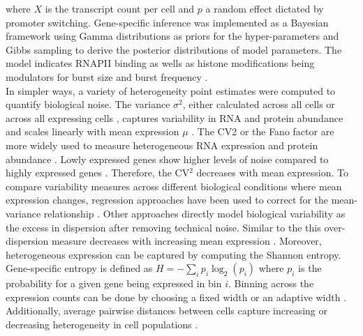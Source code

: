 where $X$ is the transcript count per cell and $p$ a random effect dictated by promoter switching. Gene-specific inference was implemented as a Bayesian framework using Gamma distributions as priors for the hyper-parameters and Gibbs sampling to derive the posterior distributions of model parameters. The model indicates RNAPII binding as wells as histone modifications being modulators for burst size and burst frequency \citep{Kim2013}. \\

In simpler ways, a variety of heterogeneity point estimates were computed to quantify biological noise. The variance $\sigma^2$, either calculated across all cells or across all expressing cells \citep{Shalek2014}, captures variability in RNA and protein abundance and scales linearly with mean expression $\mu$ \citep{Dey2015a}. The \gls{CV2} or the Fano factor are more widely used to measure heterogeneous RNA expression \citep{Brennecke2013, Jones2014} and protein abundance \citep{Newman2006}. Lowly expressed genes show higher levels of noise compared to highly expressed genes \citep{Brennecke2013}. Therefore, the CV$^2$ decreases with mean expression. To compare variability measures across different biological conditions where mean expression changes, regression approaches have been used to correct for the mean-variance relationship \citep{Kolodziejczyk2015cell, Fan2016}. Other approaches directly model biological variability as the excess in dispersion after removing technical noise. Similar to the \citep{Brennecke2013} this over-dispersion measure decreases with increasing mean expression \citep{Vallejos2015BASiCS}. Moreover, heterogeneous expression can be captured by computing the Shannon entropy. Gene-specific entropy is defined as $H=-\sum_i{}p_i\log_2(p_i)$ where $p_i$ is the probability for a given gene being expressed in bin $i$. Binning across the expression counts can be done by choosing a fixed width \citep{Richard2016} or an adaptive width \citep{Stumpf2017}. Additionally, average pairwise distances between cells capture increasing or decreasing heterogeneity in cell populations \citep{Mohammed2017}. \\ 
